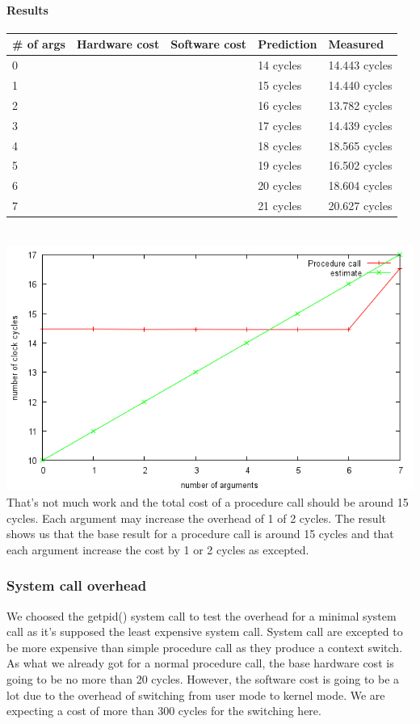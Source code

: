 \paragraph{Results}
\begin{tabular}{| l | l | l | l | l |}
\hline
\# of args & Hardware cost & Software cost & Prediction & Measured \\ \hline
0 &   &   & 14 cycles & 14.443 cycles \\ \hline
1 &   &   & 15 cycles & 14.440 cycles \\ \hline
2 &   &   & 16 cycles & 13.782 cycles \\ \hline
3 &   &   & 17 cycles & 14.439 cycles \\ \hline
4 &   &   & 18 cycles & 18.565 cycles \\ \hline
5 &   &   & 19 cycles & 16.502 cycles \\ \hline
6 &   &   & 20 cycles & 18.604 cycles \\ \hline
7 &   &   & 21 cycles & 20.627 cycles \\ \hline
\end{tabular} \\
\includegraphics{procCallImage}
That's not much work and the total cost of a procedure call should be around 15
cycles. Each argument may increase the overhead of 1 of 2 cycles.
The result shows us that the base result for a procedure call is around 15
cycles and that each argument increase the cost by 1 or 2 cycles as excepted.

\subsubsection{System call overhead}
We choosed the getpid() system call to test the overhead for a minimal system
call as it's supposed the least expensive system call.
System call are excepted to be more expensive than simple procedure call as they
produce a context switch. As what we already got for a normal procedure call, the base hardware cost is going to be no more than 20 cycles. However, the software cost is going to be a lot due to the overhead of switching from user mode to kernel mode. We are expecting a cost of more than 300 cycles for the switching here.

